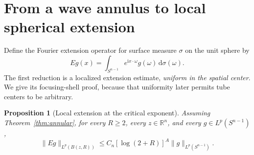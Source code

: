 \documentclass[11pt,a4paper]{article}
\numberwithin{equation}{section}
\newtheorem{proposition}[theorem]{Proposition}
\theoremstyle{definition}
\theoremstyle{remark}
\newcommand{\R}{\mathbb R}
\newcommand{\dd}{\,\mathrm d}
\newcommand{\Sph}{S^{n-1}}
\begin{document}
\section{From a wave annulus to local spherical extension}
\label{sec:extension}
Define the Fourier extension operator for surface measure
$\sigma$ on the unit sphere by
\begin{equation}\label{eq:extension}
 Eg(x)=\int_{\Sph}e^{\mathrm ix\cdot\omega}g(\omega)
                    \dd\sigma(\omega).
\end{equation}
The first reduction is a localized extension estimate, \emph{uniform
in the spatial center}. We give its focusing-shell proof, because
that uniformity later permits tube centers to be arbitrary.

\begin{proposition}[Local extension at the critical exponent]
\label{prop:localext}
Assuming Theorem~\ref{thm:annular}, for every $R\ge2$, every
$z\in\R^n$, and every $g\in L^p(\Sph)$,
\begin{equation}\label{eq:localext}
 \|Eg\|_{L^p(B(z,R))}
 \le C_n[\log(2+R)]^{A}\|g\|_{L^p(\Sph)}.
\end{equation}
\end{proposition}
\end{document}
